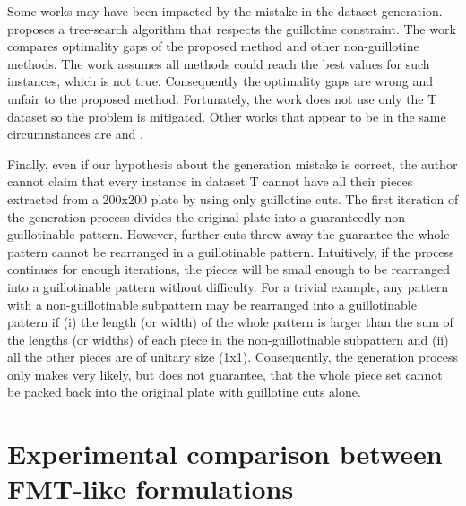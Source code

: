 \documentclass[ppgc,tese,english,formais,babel]{iiufrgs}
\begin{document}
Some works may have been impacted by the mistake in the dataset generation.
\citet{bortfeldt:2012} %
proposes a tree-search algorithm that respects the guillotine constraint.
The work compares optimality gaps of the proposed method and other non-guillotine methods.
The work assumes all methods could reach the best values for such instances, which is not true.
Consequently the optimality gaps are wrong and unfair to the proposed method.
Fortunately, the work does not use only the T dataset so the problem is mitigated.
Other works that appear to be in the same circumnstances are
\citet{thomas:2014} and %
\citet{shang:2020}. %

Finally, even if our hypothesis about the generation mistake is correct, the author cannot claim that every instance in dataset T cannot have all their pieces extracted from a 200x200 plate by using only guillotine cuts.
The first iteration of the generation process divides the original plate into a guaranteedly non-guillotinable pattern.
However, further cuts throw away the guarantee the whole pattern cannot be rearranged in a guillotinable pattern.
Intuitively, if the process continues for enough iterations, the pieces will be small enough to be rearranged into a guillotinable pattern without difficulty.
For a trivial example, any pattern with a non-guillotinable subpattern may be rearranged into a guillotinable pattern if (i) the length (or width) of the whole pattern is larger than the sum of the lengths (or widths) of each piece in the non-guillotinable subpattern and (ii) all the other pieces are of unitary size (1x1).
Consequently, the generation process only makes very likely, but does not guarantee, that the whole piece set cannot be packed back into the original plate with guillotine cuts alone.

\chapter{Experimental comparison between FMT-like formulations}
\label{sec:experimental_results}
\label{sec:furini_vs_enhanced_comparison}
\end{document}
